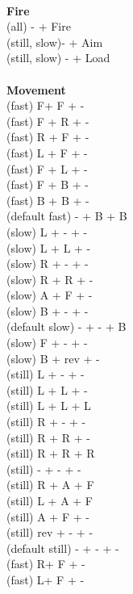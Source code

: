 \ \\ {\bf Fire } \\
(all) - + Fire \\
(still, slow)- + Aim \\
(still, slow) - + Load \\
\ \\ {\bf Movement } \\
(fast) F+ F + - \\
(fast) F + R + - \\
(fast) R + F + - \\
(fast) L + F + -  \\
(fast) F + L + - \\
(fast) F + B + - \\
(fast) B + B + - \\
(default fast) - + B + B \\
(slow) L + - + - \\
(slow) L + L + - \\
(slow) R + - + - \\
(slow) R + R + - \\
(slow) A + F + - \\
(slow) B + - + - \\
(default slow) - + - + B \\
(slow) F + - + - \\
(slow) B + rev + - \\
(still) L + - + - \\
(still) L + L + - \\
(still) L + L + L \\
(still) R + - + - \\
(still) R + R + - \\
(still) R + R + R \\
(still) - + - + - \\
(still) R + A + F \\
(still) L + A + F \\
(still) A + F + - \\
(still) rev + - + - \\
(default still) - + - + - \\
(fast) R+ F + - \\
(fast) L+ F + - \\



